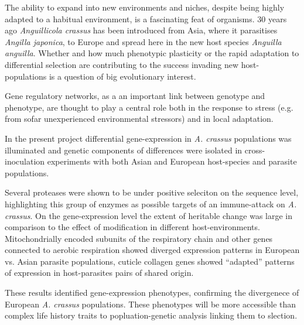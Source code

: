 


\begin{abstracts}        %

  The ability to expand into new environments and niches, despite
  being highly adapted to a habitual environment, is a fascinating
  feat of organisms. 30 years ago \textit{Anguillicola crassus} has
  been introduced from Asia, where it parasitises \textit{Angilla
    japonica}, to Europe and spread here in the new host species
  \textit{Anguilla anguilla}. Whether and how much phenotypic
  plasticity or the rapid adaptation to differential selection are
  contributing to the success invading new host-populations is a
  question of big evolutionary interest.

  Gene regulatory networks, as a an important link between genotype
  and phenotype, are thought to play a central role both in the
  response to stress (e.g. from sofar unexperienced environmental
  stressors) and in local adaptation.

  In the present project differential gene-expression in
  \textit{A. crassus} populations was illuminated and genetic
  components of differences were isolated in cross-inoculation
  experiments with both Asian and European host-species and parasite
  populations.

  Several proteases were shown to be under positive seleciton on the
  sequence level, highlighting this group of enzymes as possible
  targets of an immune-attack on \textit{A. crassus}. On the
  gene-expression level the extent of heritable change was large in
  comparison to the effect of modification in different
  host-environments. Mitochondrially encoded subunits of the
  respiratory chain and other genes connected to aerobic respiration
  showed diverged expression patterns in European vs. Asian parasite
  populations, cuticle collagen genes showed ``adapted'' patterns of
  expression in host-parasites pairs of shared origin.
  
  These results identified gene-expression phenotypes, confirming the
  divergenece of European \textit{A. crassus} populations. These
  phenotypes will be more accessible than complex life history traits
  to popluation-genetic analysis linking them to slection.
  

\end{abstracts}



     